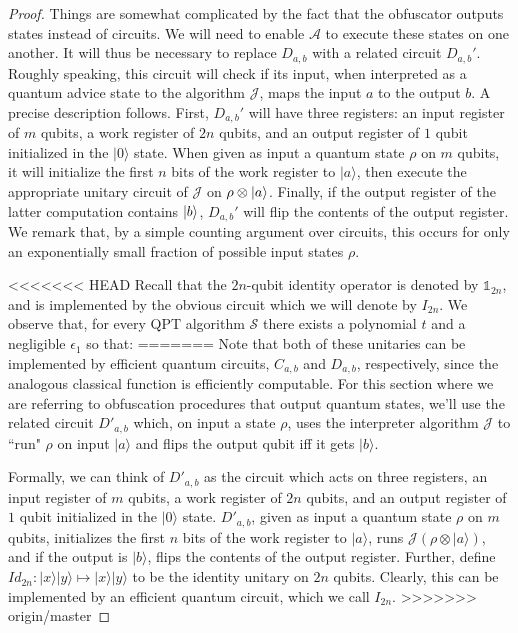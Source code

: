\documentclass[11pt]{article}
\numberwithin{equation}{section}
\newcommand{\one}{\mathds 1}
\newcommand{\algo}{\mathcal}
\begin{document}
{\begin{proof}
Things are somewhat complicated by the fact that the obfuscator outputs states instead of circuits. We will need to enable $\algo A$ to execute these states on one another. It will thus be necessary to replace $D_{a, b}$ with a related circuit $D_{a, b}'$. Roughly speaking, this circuit will check if its input, when interpreted as a quantum advice state to the algorithm $\algo J$, maps the input $a$ to the output $b$. A precise description follows. First, $D_{a, b}'$ will have three registers: an input register of $m$ qubits, a work register of $2n$ qubits, and an output register of $1$ qubit initialized in the $|0\rangle$ state. When given as input a quantum state $\rho$ on $m$ qubits, it will initialize the first $n$ bits of the work register to $|a\rangle$, then execute the appropriate unitary circuit of $\algo J$ on $\rho \otimes {\left\vert{a}\right\rangle}$. Finally, if the output register of the latter computation contains ${\left\vert{b}\right\rangle}$, $D_{a, b}'$ will flip the contents of the output register. We remark that, by a simple counting argument over circuits, this occurs for only an exponentially small fraction of possible input states $\rho$.

<<<<<<< HEAD
Recall that the $2n$-qubit identity operator is denoted by $\one_{2n}$, and is implemented by the obvious circuit which we will denote by $I_{2n}$. We observe that, for every QPT algorithm $\mathcal S$ there exists a polynomial $t$ and a negligible $\epsilon_1$ so that:
=======
Note that both of these unitaries can be implemented by efficient quantum circuits, $C_{a,b}$ and $D_{a,b}$, respectively, since the analogous classical function is efficiently computable.  For this section where we are referring to obfuscation procedures that output quantum states, we'll use the related circuit $D'_{a,b}$ which, on input a state $\rho$, uses the interpreter algorithm $\algo{J}$ to ``run" $\rho$ on input $|a\rangle$ and flips the output qubit iff it gets $|b\rangle$.  

Formally, we can think of $D'_{a,b}$ as the circuit which acts on three registers, an input register of $m$ qubits, a work register of $2n$ qubits, and an output register of $1$ qubit initialized in the $|0\rangle$ state.  $D'_{a,b}$, given as input a quantum state $\rho$ on $m$ qubits, initializes the first $n$ bits of the work register to $|a\rangle$, runs $\mathcal{J}(\rho\otimes|a\rangle)$, and if the output is $|b\rangle$, flips the contents of the output register.  Further, define $Id_{2n}:|x\rangle|y\rangle\longmapsto|x\rangle|y\rangle$ to be the identity unitary on $2n$ qubits.  Clearly, this can be implemented by an efficient quantum circuit, which we call $I_{2n}$.
>>>>>>> origin/master


\end{proof}}
\end{document}
